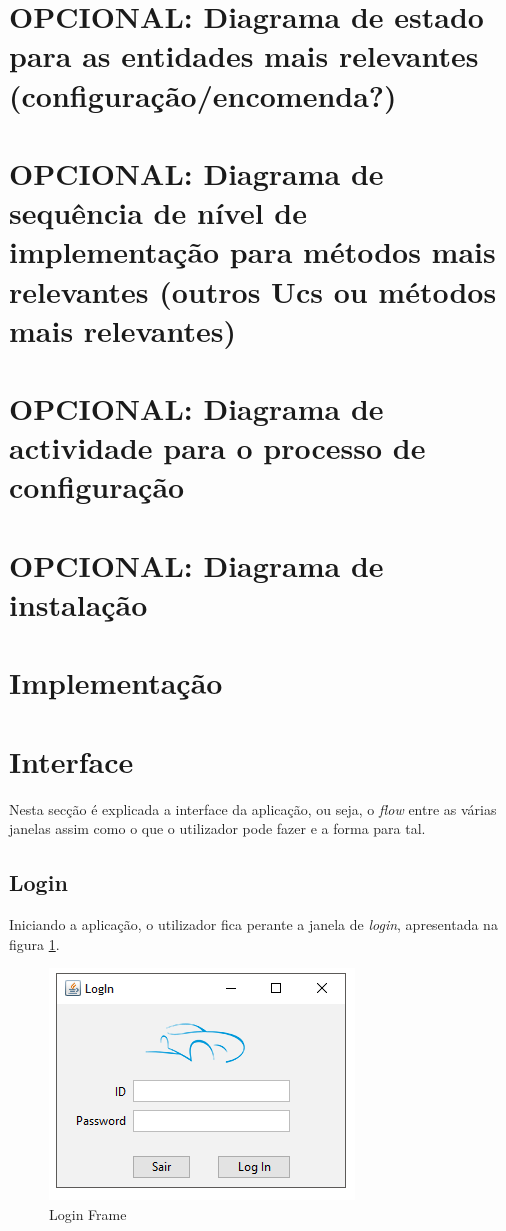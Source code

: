\documentclass[11pt]{article} %
\begin{document}
\section{OPCIONAL: Diagrama de estado para as entidades mais relevantes
(configuração/encomenda?)}

\section{OPCIONAL: Diagrama de sequência de nível de implementação para métodos mais
relevantes (outros Ucs ou métodos mais relevantes)}

\section{OPCIONAL: Diagrama de actividade para o processo de configuração}

\section{OPCIONAL: Diagrama de instalação}

\section{Implementação}


\section{Interface}

Nesta secção é explicada a interface da aplicação, ou seja, o \textit{flow} entre as várias janelas assim como o que o utilizador pode fazer e a forma para tal. 

\subsection{Login}
Iniciando a aplicação, o utilizador fica perante a janela de \textit{login}, apresentada na figura \ref{loginframe}. 
\begin{figure}[H]
	\centering
	\includegraphics[]{loginframe.png}
	\caption{Login Frame}
	\label{loginframe}
\end{figure}
\end{document}
